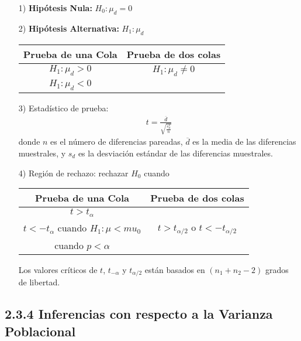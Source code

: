 \begin{frame}
\begin{frame}
\begin{itemize}
\item[1) ] \textbf{Hip\'otesis Nula:} $H_{0}:\mu_{d}=0$
\item[2) ] \textbf{Hip\'otesis Alternativa: } $H_{1}:\mu_{d}$
\begin{tabular}{cc}\hline
\textbf{Prueba de una Cola} & \textbf{Prueba de dos colas}\\\hline
$H_{1}:\mu_{d}>0$ & $H_{1}:\mu_{d}\neq 0$\\ 
$H_{1}:\mu_{d}<0$&\\
\end{tabular}
\item[3) ] Estad\'istico de prueba:
\begin{eqnarray*}
t=\frac{\overline{d}}{\sqrt{\frac{s_{d}^{2}}{n}}}
\end{eqnarray*}
donde $n$ es el n\'umero de diferencias pareadas, $\overline{d}$ es la media de las diferencias muestrales, y $s_{d}$ es la desviaci\'on est\'andar de las diferencias muestrales.

\end{itemize}






\begin{itemize}
\item[4) ] Regi\'on de rechazo: rechazar $H_{0}$ cuando
\begin{tabular}{cc}\hline
\textbf{Prueba de una Cola} & \textbf{Prueba de dos colas}\\\hline
$t>t_{\alpha}$ & \\
$t<-t_{\alpha}$ cuando $H_{1}:\mu<mu_{0}$&$t>t_{\alpha/2}$ o $t<-t_{\alpha/2}$\\
 cuando $p<\alpha$&\\
\end{tabular}

Los valores cr\'iticos de $t$, $t_{-\alpha}$ y $t_{\alpha/2}$ est\'an basados en $\left(n_{1}+n_{2}-2\right)$ grados de libertad.

\end{itemize}






\subsection{2.3.4 Inferencias con respecto a la Varianza Poblacional}





\end{frame}
\end{frame}
